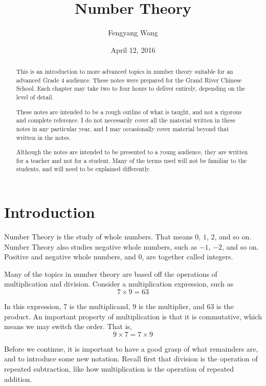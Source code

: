 \documentclass[a4paper,10pt]{report}
\title{Number Theory}
\author{Fengyang Wang}
\date{April 12, 2016}
\begin{document}
\begin{abstract}

 This is an introduction to more advanced topics in number theory suitable for
 an advanced Grade 4 audience. These notes were prepared for the Grand River
 Chinese School. Each chapter may take two to four hours to deliver entirely,
 depending on the level of detail.

 These notes are intended to be a rough outline of what is taught, and not a
 rigorous and complete reference. I do not necessarily cover all the material
 written in these notes in any particular year, and I may occasionally cover
 material beyond that written in the notes.

 Although the notes are intended to be presented to a young audience, they are
 written for a teacher and not for a student. Many of the terms used will not be
 familiar to the students, and will need to be explained differently.

\end{abstract}

\maketitle

\tableofcontents

\chapter{Introduction}

Number Theory is the study of whole numbers. That means $0$, $1$, $2$, and so
on. Number Theory also studies negative whole numbers, such as $-1$, $-2$, and
so on. Positive and negative whole numbers, and $0$, are together called
\glspl{integer}.

Many of the topics in number theory are based off the operations of
multiplication and division. Consider a multiplication expression, such as \[ 7
\times 9 = 63 \]

In this expression, $7$ is the \gls{multiplicand}, $9$ is the \gls{multiplier},
and $63$ is the \gls{product}. An important property of multiplication is that
it is commutative, which means we may switch the order. That is, \[ 9 \times 7 =
7 \times 9 \]

Before we continue, it is important to have a good grasp of what remainders are,
and to introduce some new notation. Recall first that division is the operation
of repeated subtraction, like how multiplication is the operation of repeated
addition.
\end{document}
